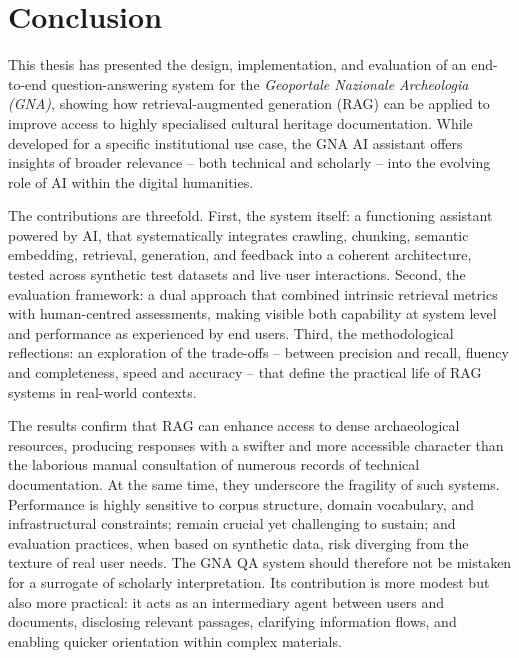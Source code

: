 \chapter{Conclusion}
\label{chap:conclusion}
\begin{spacing}{1.5}
This thesis has presented the design, implementation, and evaluation of an end-to-end question-answering system for the \textit{Geoportale Nazionale Archeologia (GNA)}, showing how retrieval-augmented generation (RAG) can be applied to improve access to highly specialised cultural heritage documentation. While developed for a specific institutional use case, the GNA AI assistant offers insights of broader relevance -- both technical and scholarly -- into the evolving role of AI within the digital humanities.

The contributions are threefold. First, the system itself: a functioning assistant powered by AI, that systematically integrates crawling, chunking, semantic embedding, retrieval, generation, and feedback into a coherent architecture, tested across synthetic test datasets and live user interactions. Second, the evaluation framework: a dual approach that combined intrinsic retrieval metrics with human-centred assessments, making visible both capability at system level and performance as experienced by end users. Third, the methodological reflections: an exploration of the trade-offs -- between precision and recall, fluency and completeness, speed and accuracy -- that define the practical life of RAG systems in real-world contexts.

The results confirm that RAG can enhance access to dense archaeological resources, producing responses with a swifter and more accessible character than the laborious manual consultation of numerous records of technical documentation. At the same time, they underscore the fragility of such systems. Performance is highly sensitive to corpus structure, domain vocabulary, and infrastructural constraints; remain crucial yet challenging to sustain; and evaluation practices, when based on synthetic data, risk diverging from the texture of real user needs. The GNA QA system should therefore not be mistaken for a surrogate of scholarly interpretation. Its contribution is more modest but also more practical: it acts as an intermediary agent between users and documents, disclosing relevant passages, clarifying information flows, and enabling quicker orientation within complex materials.


\end{spacing}
